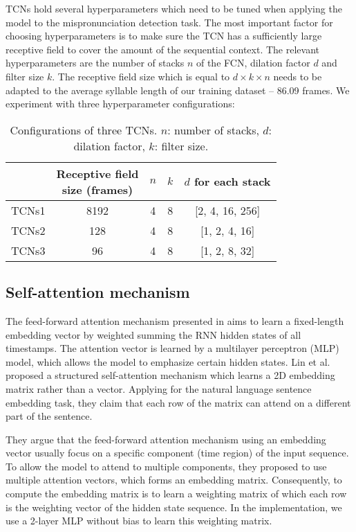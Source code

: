 TCNs hold several hyperparameters which need to be tuned when applying the model to the mispronunciation detection task. The most important factor for choosing hyperparameters is to make sure the TCN has a sufficiently large receptive field to cover the amount of the sequential context. The relevant hyperparameters are the number of stacks $n$ of the FCN, dilation factor $d$ and filter size $k$. The receptive field size which is equal to $d\times k \times n$ needs to be adapted to the average syllable length of our training dataset -- 86.09 frames. We experiment with three hyperparameter configurations:

\begin{table}[ht!]
\centering
\caption{Configurations of three TCNs. $n$: number of stacks, $d$: dilation factor, $k$: filter size.}
\label{tab:ch6:tcns_configurations}
\begin{tabular}{ccccc}
\toprule
& \makecell[c]{Receptive field\\size (frames)} & $n$ & $k$ & $d$ for each stack \\
\midrule
TCNs1 & 8192 & 4 & 8 & [2, 4, 16, 256] \\
TCNs2 & 128 & 4 & 8 & [1, 2, 4, 16] \\
TCNs3 & 96 & 4 & 8 & [1, 2, 8, 32] \\
\bottomrule
\end{tabular}
\end{table}

\subsection{Self-attention mechanism}

The feed-forward attention mechanism presented in  aims to learn a fixed-length embedding vector by weighted summing the RNN hidden states of all timestamps. The attention vector is learned by a multilayer perceptron (MLP) model, which allows the model to emphasize certain hidden states. Lin et al. \cite{Lin2017} proposed a structured self-attention mechanism which learns a 2D embedding matrix rather than a vector. Applying for the natural language sentence embedding task, they claim that each row of the matrix can attend on a different part of the sentence. 

They argue that the feed-forward attention mechanism using an embedding vector usually focus on a specific component (time region) of the input sequence. To allow the model to attend to multiple components, they proposed to use multiple attention vectors, which forms an embedding matrix. Consequently, to compute the embedding matrix is to learn a weighting matrix of which each row is the weighting vector of the hidden state sequence. In the implementation, we use a 2-layer MLP without bias to learn this weighting matrix.

